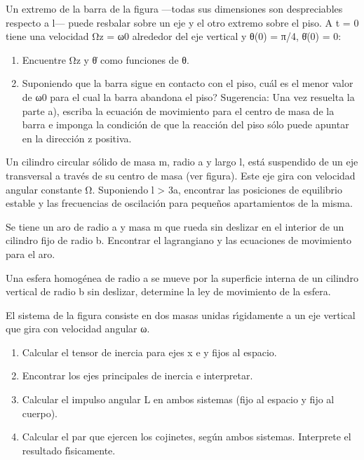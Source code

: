 \documentclass[10pt,oneside]{CBFT_book}
\begin{document}
\begin{ejercicios}
\label{ej10}
\item{ \bf }
Un extremo de la barra de la figura —todas sus dimensiones son despreciables respecto
a l— puede resbalar sobre un eje y el otro extremo sobre el piso. A t = 0 tiene una
velocidad Ωz = ω0 alrededor del eje vertical y θ(0) = π/4, θ̇(0) = 0:
\begin{enumerate}[label=(\alph*)]
\item Encuentre Ωz y θ̇ como funciones de θ.
\item Suponiendo que la barra sigue en contacto con el piso, cuál es el menor valor de
ω0 para el cual la barra abandona el piso?
Sugerencia: Una vez resuelta la parte a), escriba la ecuación de movimiento para
el centro de masa de la barra e imponga la condición de que la reacción del piso
sólo puede apuntar en la dirección z positiva.
\end{enumerate}


\label{ej11}
\item{ \bf }
Un cilindro circular sólido de masa m, radio a y largo l, está suspendido de un eje
transversal a través de su centro de masa (ver figura). Este eje gira con velocidad
angular constante Ω. Suponiendo l > 3a, encontrar las posiciones de equilibrio
estable y las frecuencias de oscilación para pequeños apartamientos de la misma.

\label{ej12}
\item{ \bf }
Se tiene un aro de radio a y masa m que rueda sin deslizar en el interior de un cilindro
fijo de radio b. Encontrar el lagrangiano y las ecuaciones de movimiento para el aro.

\label{ej13}
\item{ \bf }
Una esfera homogénea de radio a se mueve por la superficie interna de un cilindro
vertical de radio b sin deslizar, determine la ley de movimiento de la esfera.

\label{ej14}
\item{ \bf }
El sistema de la figura consiste en dos masas unidas rı́gidamente a un eje vertical que
gira con velocidad angular ω.
\begin{enumerate}[label=(\alph*)]
\item Calcular el tensor de inercia para ejes x e y fijos al espacio.
\item Encontrar los ejes principales de inercia e interpretar.
\item Calcular el impulso angular L en ambos sistemas (fijo al espacio y fijo al cuerpo).
\item Calcular el par que ejercen los cojinetes, según ambos sistemas. Interprete el
resultado fı́sicamente.
\end{enumerate}


\end{ejercicios}
\end{document}
